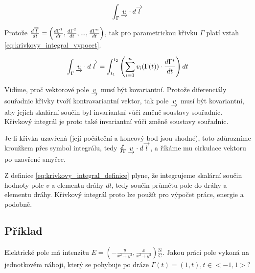 \begin{equation}
\label{eq:krivkovy_integral_definice}
\begin{split}
\int_\Gamma \underrightarrow{v} \cdot d\overrightarrow{l}
\end{split}
\end{equation}

Protože \(\frac{d\overrightarrow{l}}{dt} = \left(\frac{d \Gamma^1}{dt}, \frac{d \Gamma^2}{dt}, ..., \frac{d \Gamma^n}{dt} \right)\), tak pro parametrickou křivku
\(\Gamma\) platí vztah \eqref{eq:krivkovy_integral_vypocet}.

\begin{equation}
\label{eq:krivkovy_integral_vypocet}
\begin{split}
\int_\Gamma \underrightarrow{v} \cdot d\overrightarrow{l} =
\int_{t_1}^{t_2} \left(\sum_{i=1}^n v_i(\Gamma(t)) \cdot \frac{d \Gamma^i}{dt} \right) dt
\end{split}
\end{equation}

Vidíme, proč vektorové pole \(\underrightarrow{v}\) musí být kovariantní. Protože diferenciály souřadnic křivky tvoří kontravariantní vektor, tak pole \(\underrightarrow{v}\) musí být kovariantní, aby jejich skalární součin byl invariantní vůči změně soustavy souřadnic. Křivkový integrál je proto také invariantní vůči změně soustavy souřadnic.

Je-li křivka uzavřená (její počáteční a koncový bod jsou shodné), toto zdůrazníme kroužkem přes symbol integrálu, tedy \(\oint_\Gamma \underrightarrow{v} \cdot d\overrightarrow{l}\), a říkáme mu cirkulace vektoru po uzavřené smyčce.

Z definice \eqref{eq:krivkovy_integral_definice} plyne, že integrujeme skalární součin hodnoty pole \(v\) a elementu dráhy \(dl\),
tedy součin průmětu pole do dráhy a elementu dráhy. Křivkový integrál proto lze použít pro výpočet práce, energie a podobně.


\subsection{Příklad}

Elektrické pole má intenzitu \(E = \left(-\frac{y}{x^2+y^2}, \frac{x}{x^2+y^2}\right) \frac{\mathrm{N}}{\mathrm{C}}\). Jakou práci pole vykoná na jednotkovém náboji, který se pohybuje po dráze \(\Gamma(t) = (1, t), t \in <-1, 1>\)?





